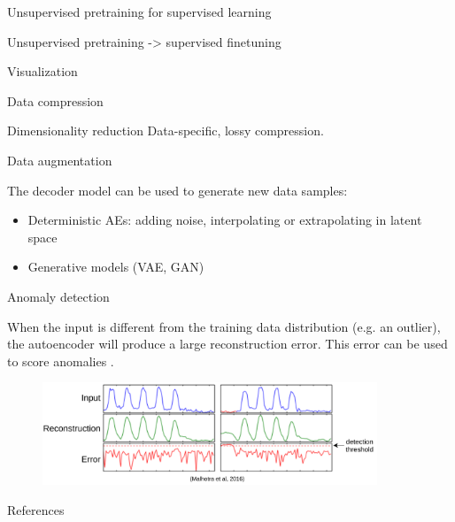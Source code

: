 \documentclass{beamer}
\begin{document}
  \begin{frame}{Unsupervised pretraining for supervised learning}
    
    Unsupervised pretraining -> supervised finetuning

    \cite{Erhan2010}

  \end{frame}

  \begin{frame}{Visualization}
    
  \end{frame}

  \begin{frame}{Data compression}
    
    Dimensionality reduction
    Data-specific, lossy compression.

  \end{frame}  

  \begin{frame}{Data augmentation}

    The decoder model can be used to \alert{generate new data samples}:

    \begin{itemize}
      \item Deterministic AEs: adding noise, interpolating or extrapolating in latent space \cite{Devries2017}
      \item Generative models (VAE, GAN)
    \end{itemize}

  \end{frame}

  \begin{frame}{Anomaly detection}
    
    When the input is different from the training data distribution (e.g. an outlier), the autoencoder will produce a large reconstruction error. This error can be used to \alert{score anomalies} \cite{Malhotra2016}.

    \begin{figure}
      \includegraphics[width=10cm]{rc/anomaly-detection}
    \end{figure}

  \end{frame}

  \appendix

  \begin{frame}[allowframebreaks]{References}
    
    
    
  
  \end{frame}
\end{document}
